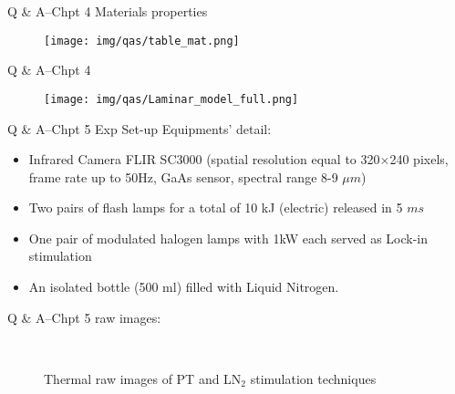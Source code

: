 \begin{frame}{Q \& A--Chpt 4 \small{Materials properties}}
    \begin{figure}[ht]
      \centering
      \texttt{[image: img/qas/table\_mat.png]}
    \end{figure}

\end{frame}



\begin{frame}{Q \& A--Chpt 4 }
    \begin{figure}
      \centering
      \texttt{[image: img/qas/Laminar\_model\_full.png]}
    \end{figure}
\end{frame}

\begin{frame}{Q \& A--Chpt 5 \small{Exp Set-up}}
    Equipments' detail:
    \begin{itemize}
        \item Infrared Camera FLIR SC3000 (spatial resolution equal to 320$\times$240 pixels, frame rate up to 50Hz, GaAs sensor, spectral range 8-9 $\mu m$)
        \item Two pairs of flash lamps for a total of 10 kJ (electric) released in 5 $ms $ 
        \item One pair of modulated halogen lamps with 1kW each served as Lock-in    stimulation   
        \item An isolated bottle (500 ml) filled with  Liquid Nitrogen.
\end{itemize}
\end{frame}


\begin{frame}{Q \& A--Chpt 5 \small{raw images:}}
    \begin{figure}
     \vspace{-18pt}
       \\
       \vspace*{-10pt}
       \caption{Thermal raw images of PT and LN$_2$ stimulation techniques}      
    \end{figure}
\end{frame}


